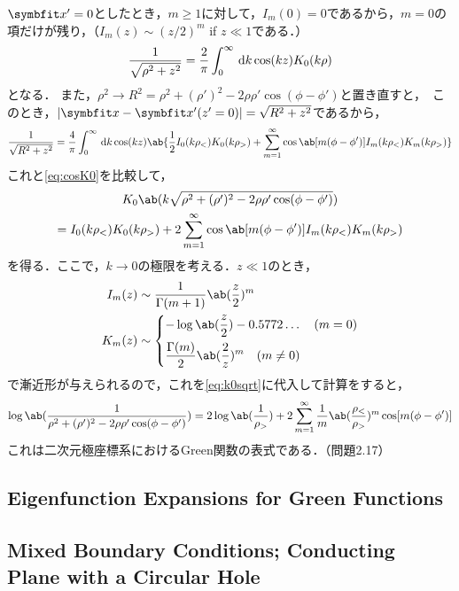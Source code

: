 $\bs{x}' = 0$としたとき，$m \geq 1$に対して，$I_m(0) = 0$であるから，$m = 0$の項だけが残り，（$I_m(z) \sim (z/2)^m $ if $z \ll 1$である．）
\begin{gather}
  \label{eq:cosK0}
  \frac{1}{\sqrt{\rho^2 + z^2}} = \frac{2}{\pi} \int_0^\infty \dl{k} \cos(kz) K_0(k\rho)
\end{gather}
となる．
また，$\rho^2 \to R^2 = \rho^2 + (\rho')^2 - 2 \rho \rho' \cos(\phi - \phi')$と置き直すと， このとき，$|\bs{x} - \bs{x}'(z'=0)| = \sqrt{R^2 + z^2}$であるから，
\begin{gather}
  \frac{1}{\sqrt{R^2 + z^2}} = \frac{4}{\pi} \int_0^\infty \dl{k} \cos(kz) \ab\{ \frac12 I_0(k\rho_<)K_0(k\rho_>) + \sum_{m=1}^{\infty}\cos\ab[m(\phi - \phi')]I_m(k\rho_<) K_m(k\rho_>)\}
\end{gather}
これと\eqref{eq:cosK0}を比較して，
\begin{multline}
  \label{eq:k0sqrt}
  K_0\ab(k\sqrt{\rho^2 + (\rho')^2 - 2 \rho \rho'\cos(\phi - \phi')}) \\
  = I_0(k\rho_<)K_0(k\rho_>) + 2 \sum_{m=1}^{\infty}\cos\ab[m(\phi - \phi')]I_m(k\rho_<) K_m(k\rho_>)
\end{multline}
を得る．ここで，$k\to 0$の極限を考える．$z \ll 1$のとき，
\begin{align}
  I_m(z) &\sim \frac{1}{\Gamma(m+1)} \ab(\frac{z}{2})^m\\
  K_m(z) &\sim
  \begin{dcases}
    -\log\ab(\frac{z}2) - 0.5772\ldots \qq (m=0)\\
    \frac{\Gamma(m)}{2}\ab(\frac{2}{z})^m\qq (m\neq 0)
  \end{dcases}
\end{align}
で漸近形が与えられるので，これを\eqref{eq:k0sqrt}に代入して計算をすると，
\begin{gather}
  \log\ab(\frac{1}{\rho^2 + (\rho')^2 - 2 \rho \rho' \cos(\phi - \phi')}) = 2\log\ab(\frac{1}{\rho_>}) + 2 \sum_{m=1}^{\infty}\frac{1}{m}\ab(\frac{\rho_<}{\rho_>})^m\cos[m(\phi - \phi')]
\end{gather}
これは二次元極座標系におけるGreen関数の表式である．（問題2.17）


\subsection{Eigenfunction Expansions for Green Functions}

\subsection{Mixed Boundary Conditions; Conducting Plane with a Circular Hole}

